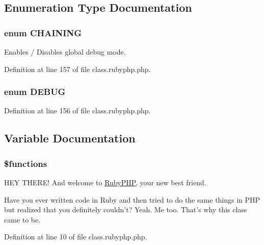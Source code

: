 \subsection{Enumeration Type Documentation}
\hypertarget{class_8rubyphp_8php_a2ef56c4551609dbec9cf98bd6008f646}{
\subsubsection[{C\-H\-A\-I\-N\-I\-N\-G}]{\setlength{\rightskip}{0pt plus 5cm}enum {\bf C\-H\-A\-I\-N\-I\-N\-G}}}\label{class_8rubyphp_8php_a2ef56c4551609dbec9cf98bd6008f646}


Enables / Disables global debug mode. 



Definition at line 157 of file class.\-rubyphp.\-php.

\hypertarget{class_8rubyphp_8php_a73585d7121de037cf2e2ca12b27eb83e}{
\subsubsection[{D\-E\-B\-U\-G}]{\setlength{\rightskip}{0pt plus 5cm}enum {\bf D\-E\-B\-U\-G}}}\label{class_8rubyphp_8php_a73585d7121de037cf2e2ca12b27eb83e}


Definition at line 156 of file class.\-rubyphp.\-php.



\subsection{Variable Documentation}
\hypertarget{class_8rubyphp_8php_aa75daea491817f3b64daa2f51128bcdf}{
\subsubsection[{\$functions}]{\setlength{\rightskip}{0pt plus 5cm}\$functions}}\label{class_8rubyphp_8php_aa75daea491817f3b64daa2f51128bcdf}
H\-E\-Y T\-H\-E\-R\-E! And welcome to \hyperlink{namespace_ruby_p_h_p}{Ruby\-P\-H\-P}, your new best friend.

Have you ever written code in Ruby and then tried to do the same things in P\-H\-P but realized that you definitely couldn't? Yeah. Me too. That's why this class came to be. 

Definition at line 10 of file class.\-rubyphp.\-php.

